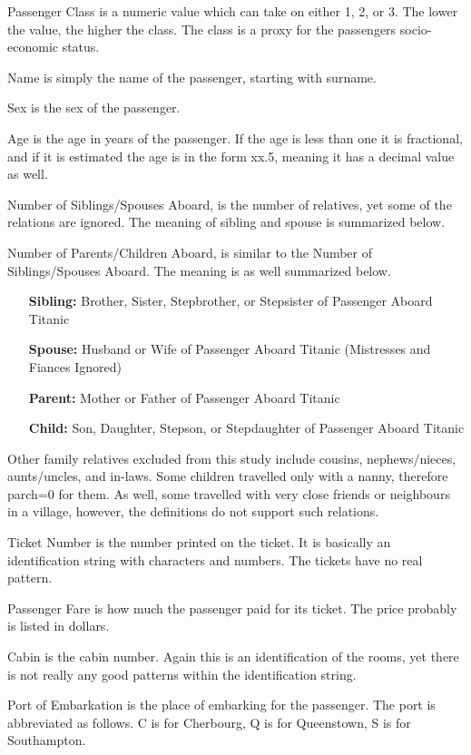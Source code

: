 \documentclass[a4paper,11pt]{article}
\begin{document}
Passenger Class is a numeric value which can take on either 1, 2, or 3. The lower the value, the higher the class. The class is a proxy for the passengers socio-economic status.

Name is simply the name of the passenger, starting with surname.

Sex is the sex of the passenger.

Age is the age in years of the passenger. If the age is less than one it is fractional, and if it is estimated the age is in the form xx.5, meaning it has a decimal value as well.

Number of Siblings/Spouses Aboard, is the number of relatives, yet some of the relations are ignored. The meaning of sibling and spouse is summarized below.

Number of Parents/Children Aboard, is similar to the Number of Siblings/Spouses Aboard. The meaning is as well summarized below.
\begin{itemize}
	\item[\textbf{Sibling:}] Brother, Sister, Stepbrother, or Stepsister of Passenger Aboard Titanic
	\item[\textbf{Spouse:}] Husband or Wife of Passenger Aboard Titanic (Mistresses and Fiances Ignored)
\item[\textbf{Parent:}] Mother or Father of Passenger Aboard Titanic
\item[\textbf{Child:}] Son, Daughter, Stepson, or Stepdaughter of Passenger Aboard Titanic
\end{itemize}

Other family relatives excluded from this study include cousins, nephews/nieces, aunts/uncles, and in-laws.  Some children travelled only with a nanny, therefore parch=0 for them.  As well, some travelled with very close friends or neighbours in a village, however, the definitions do not support such relations.

Ticket Number is the number printed on the ticket. It is basically an identification string with characters and numbers. The tickets have no real pattern.

Passenger Fare is how much the passenger paid for its ticket. The price probably is listed in dollars.

Cabin is the cabin number. Again this is an identification of the rooms, yet there is not really any good patterns within the identification string.

Port of Embarkation is the place of embarking for the passenger. The port is abbreviated as follows. C is for Cherbourg,	Q is for Queenstown, S is for Southampton.
\end{document}
